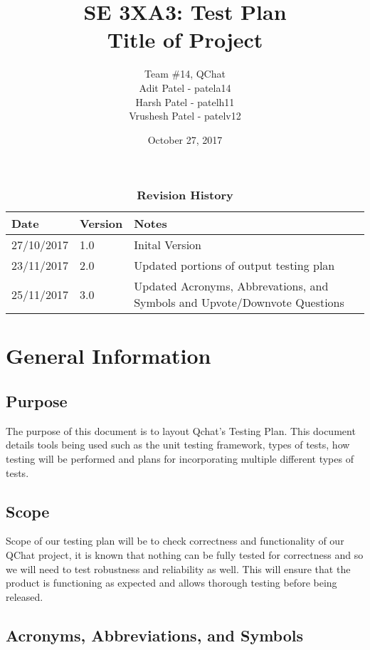 \documentclass[12pt, titlepage]{article}
\title{SE 3XA3: Test Plan\\Title of Project}
\author{Team \#14, QChat
		\\ Adit Patel - patela14
		\\ Harsh Patel - patelh11
		\\ Vrushesh Patel - patelv12
}
\date{October 27, 2017}
\begin{document}
\maketitle

\tableofcontents
\listoftables
\listoffigures


\begin{table}[bp]
\caption{\bf Revision History}
\begin{tabularx}{\textwidth}{p{3cm}p{2cm}X}
\toprule {\bf Date} & {\bf Version} & {\bf Notes}\\
\midrule
27/10/2017 & 1.0 & Inital Version\\
23/11/2017 & 2.0 & Updated portions of output testing plan\\
25/11/2017 & 3.0 & Updated Acronyms, Abbrevations, and Symbols and Upvote/Downvote Questions\\
\bottomrule
\end{tabularx}
\end{table}


\newpage


\section{General Information}

\subsection{Purpose}
The purpose of this document is to layout Qchat’s Testing Plan. This document details tools being used such as the unit testing framework, types of tests, how testing will be performed and plans for incorporating multiple different types of tests. 

\subsection{Scope}
Scope of our testing plan will be to check correctness and functionality of our QChat project, it is known that nothing can be fully tested for correctness and so we will need to test robustness and reliability as well. This will ensure that the product is functioning as expected and allows thorough testing before being released. 

\subsection{Acronyms, Abbreviations, and Symbols}
	
\end{document}
